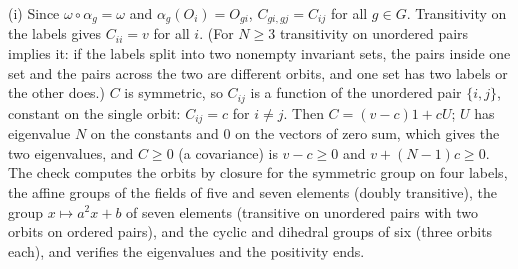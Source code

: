 (i) Since $\omega \circ \alpha_{g} = \omega$ and $\alpha_{g}(O_{i}) = O_{gi}$, $C_{gi,gj} = C_{ij}$ for all $g \in G$. Transitivity on the labels gives $C_{ii} = v$ for all $i$. (For $N \ge 3$ transitivity on unordered pairs implies it: if the labels split into two nonempty invariant sets, the pairs inside one set and the pairs across the two are different orbits, and one set has two labels or the other does.) $C$ is symmetric, so $C_{ij}$ is a function of the unordered pair $\{i, j\}$, constant on the single orbit: $C_{ij} = c$ for $i \ne j$. Then $C = (v - c)1 + cU$; $U$ has eigenvalue $N$ on the constants and $0$ on the vectors of zero sum, which gives the two eigenvalues, and $C \ge 0$ (a covariance) is $v - c \ge 0$ and $v + (N - 1)c \ge 0$. The check computes the orbits by closure for the symmetric group on four labels, the affine groups of the fields of five and seven elements (doubly transitive), the group $x \mapsto a^{2}x + b$ of seven elements (transitive on unordered pairs with two orbits on ordered pairs), and the cyclic and dihedral groups of six (three orbits each), and verifies the eigenvalues and the positivity ends.

